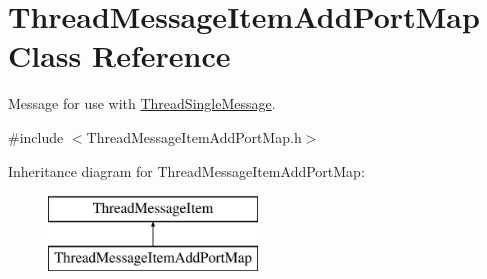 \hypertarget{class_thread_message_item_add_port_map}{
\section{ThreadMessageItemAddPortMap Class Reference}
\label{class_thread_message_item_add_port_map}
}


Message for use with \hyperlink{class_thread_single_message}{ThreadSingleMessage}.  




{\ttfamily \#include $<$ThreadMessageItemAddPortMap.h$>$}

Inheritance diagram for ThreadMessageItemAddPortMap:\begin{figure}[H]
\begin{center}
\leavevmode
\includegraphics[height=2.000000cm]{class_thread_message_item_add_port_map}
\end{center}
\end{figure}
